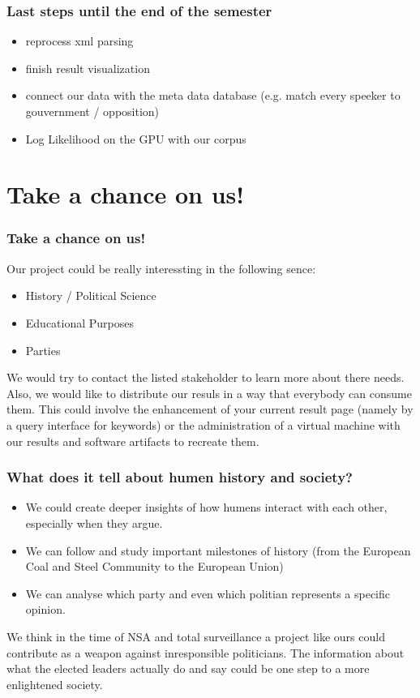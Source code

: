 \documentclass[11pt, a4paper]{beamer}
\begin{document}
\begin{frame}
\frametitle{Last steps until the end of the semester}
\begin{itemize}
	\item reprocess xml parsing
	\item finish result visualization 
	\item connect our data with the meta data database (e.g. match every speeker to gouvernment / opposition)
	\item Log Likelihood on the GPU with our corpus
\end{itemize}
\end{frame}

\section{Take a chance on us!}
\begin{frame}
\frametitle{Take a chance on us!}
Our project could be really interessting in the following sence:
\begin{itemize}
\item History / Political Science  
\item Educational Purposes
\item Parties 
\end{itemize}
We would try to contact the listed stakeholder to learn more about there needs.\\

Also, we would like to distribute our resuls in a way that everybody can consume them. 
This could involve the enhancement of your current result page (namely by a query interface for keywords) or the 
administration of a virtual machine with our results and software artifacts to recreate them.
\end{frame}

\begin{frame}
\frametitle{What does it tell about humen history and society?}
\begin{itemize}
\item We could create deeper insights of how humens interact with each other, especially when they argue.
\item We can follow and study important milestones of history (from the European Coal and Steel Community to the European Union)
\item We can analyse which party and even which politian represents a specific opinion.
\end{itemize}
We think in the time of NSA and total surveillance a project like ours could contribute as a weapon against inresponsible politicians. 
The information about what the elected leaders actually do and say could be one step to a more enlightened society.

\end{frame}

\printbibliography
\end{document}
